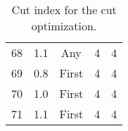 \begin{table}[H]
{\begin{tabular}{ccccc}
      68                &  1.1  & Any     &     4                           & 4                     \\ 
      69                &  0.8  & First   &     4                           & 4                   \\ 
      70                &  1.0  & First   &     4                           & 4                   \\ 
      71                &  1.1  & First   &     4                           & 4                   \\  \hline
    \end{tabular}
  }
  \caption{Cut index for the cut optimization.}
  \label{table_app_cutindex}
\end{table}




